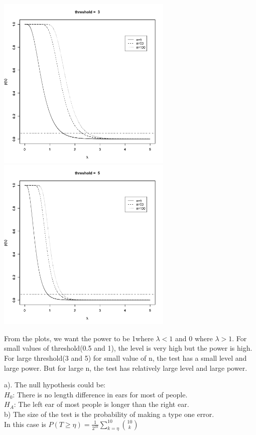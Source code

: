 \documentclass[11pt]{article}
\newenvironment{problem}[2][Problem]{\begin{trivlist}
\item[\hskip \labelsep {\bfseries #1}\hskip \labelsep {\bfseries #2.}]}{\end{trivlist}}
\begin{document}
\begin{centering}
\includegraphics[height = 3.3in]{Q6} \includegraphics[height = 3.3in]{Q10} 
\end{centering}
From the plots, we want the power to be 1where $\lambda < 1$ and 0 where $\lambda >1$. For small values of threshold(0.5 and 1), the level is very high but the power is high. For large threshold(3 and 5) for small value of n, the test has a small level and large power. But for large n, the test has relatively large level and large power. 

\pagebreak
\begin{problem}{3}
\end{problem}
a). The null hypothesis could be:\\
 $H_0$: There is no length difference in ears for most of people.\\ 
 $H_A$: The left ear of most people is longer than the right ear.\\
 
b) The size of the test is the probability of making a type one error.\\ In this case is $P(T \geq \eta) = \frac{1}{2^{10}} \sum_{k = \eta}^{10} {10 \choose k}$\\
\end{document}
